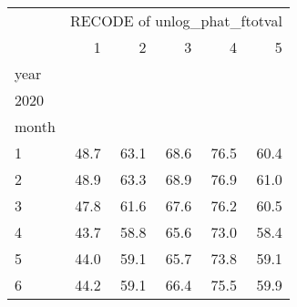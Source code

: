\begin{tabular}{llllll}
\cline{1-6}
\multicolumn{1}{c}{} &
  \multicolumn{5}{|c}{RECODE of unlog\_phat\_ftotval} \\
\multicolumn{1}{c}{} &
  \multicolumn{1}{|r}{1} &
  \multicolumn{1}{r}{2} &
  \multicolumn{1}{r}{3} &
  \multicolumn{1}{r}{4} &
  \multicolumn{1}{r}{5} \\
\cline{1-6}
\multicolumn{1}{l}{year} &
  \multicolumn{1}{|r}{} &
  \multicolumn{1}{r}{} &
  \multicolumn{1}{r}{} &
  \multicolumn{1}{r}{} &
  \multicolumn{1}{r}{} \\
\multicolumn{1}{l}{\hspace{1em}2020} &
  \multicolumn{1}{|r}{} &
  \multicolumn{1}{r}{} &
  \multicolumn{1}{r}{} &
  \multicolumn{1}{r}{} &
  \multicolumn{1}{r}{} \\
\multicolumn{1}{l}{\hspace{2em}month} &
  \multicolumn{1}{|r}{} &
  \multicolumn{1}{r}{} &
  \multicolumn{1}{r}{} &
  \multicolumn{1}{r}{} &
  \multicolumn{1}{r}{} \\
\multicolumn{1}{l}{\hspace{3em}1} &
  \multicolumn{1}{|r}{48.7} &
  \multicolumn{1}{r}{63.1} &
  \multicolumn{1}{r}{68.6} &
  \multicolumn{1}{r}{76.5} &
  \multicolumn{1}{r}{60.4} \\
\multicolumn{1}{l}{\hspace{3em}2} &
  \multicolumn{1}{|r}{48.9} &
  \multicolumn{1}{r}{63.3} &
  \multicolumn{1}{r}{68.9} &
  \multicolumn{1}{r}{76.9} &
  \multicolumn{1}{r}{61.0} \\
\multicolumn{1}{l}{\hspace{3em}3} &
  \multicolumn{1}{|r}{47.8} &
  \multicolumn{1}{r}{61.6} &
  \multicolumn{1}{r}{67.6} &
  \multicolumn{1}{r}{76.2} &
  \multicolumn{1}{r}{60.5} \\
\multicolumn{1}{l}{\hspace{3em}4} &
  \multicolumn{1}{|r}{43.7} &
  \multicolumn{1}{r}{58.8} &
  \multicolumn{1}{r}{65.6} &
  \multicolumn{1}{r}{73.0} &
  \multicolumn{1}{r}{58.4} \\
\multicolumn{1}{l}{\hspace{3em}5} &
  \multicolumn{1}{|r}{44.0} &
  \multicolumn{1}{r}{59.1} &
  \multicolumn{1}{r}{65.7} &
  \multicolumn{1}{r}{73.8} &
  \multicolumn{1}{r}{59.1} \\
\multicolumn{1}{l}{\hspace{3em}6} &
  \multicolumn{1}{|r}{44.2} &
  \multicolumn{1}{r}{59.1} &
  \multicolumn{1}{r}{66.4} &
  \multicolumn{1}{r}{75.5} &
  \multicolumn{1}{r}{59.9} \\

\end{tabular}
